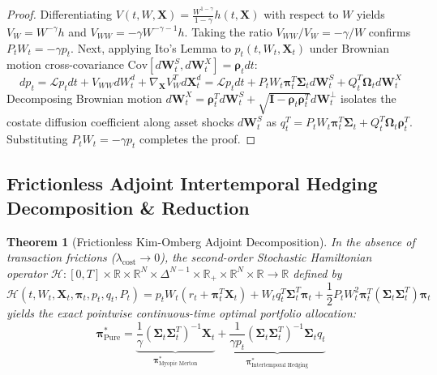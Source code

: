 \documentclass[11pt,a4paper]{article}
\theoremstyle{plain}
\newtheorem{theorem}{Theorem}[section]
\theoremstyle{definition}
\theoremstyle{remark}
\begin{document}
\begin{proof}
Differentiating $V(t, W, \mathbf{X}) = \frac{W^{1-\gamma}}{1-\gamma} h(t, \mathbf{X})$ with respect to $W$ yields $V_W = W^{-\gamma} h$ and $V_{WW} = -\gamma W^{-\gamma-1} h$. Taking the ratio $V_{WW} / V_W = -\gamma / W$ confirms $P_t W_t = -\gamma p_t$. Next, applying Ito's Lemma to $p_t(t, W_t, \mathbf{X}_t)$ under Brownian motion cross-covariance $\text{Cov}[d\mathbf{W}_t^S, d\mathbf{W}_t^X] = \mathbf{\rho}_t dt$:
\begin{equation}
    dp_t = \mathcal{L} p_t dt + V_{WW} dW_t^d + \nabla_{\mathbf{X}} V_W^T d\mathbf{X}_t^d = \mathcal{L} p_t dt + P_t W_t \mathbf{\pi}_t^T \mathbf{\Sigma}_t d\mathbf{W}_t^S + Q_t^T \mathbf{\Omega}_t d\mathbf{W}_t^X
\end{equation}
Decomposing Brownian motion $d\mathbf{W}_t^X = \mathbf{\rho}_t^T d\mathbf{W}_t^S + \sqrt{\mathbf{I} - \mathbf{\rho}_t \mathbf{\rho}_t^T} d\mathbf{W}_t^\perp$ isolates the costate diffusion coefficient along asset shocks $d\mathbf{W}_t^S$ as $q_t^T = P_t W_t \mathbf{\pi}_t^T \mathbf{\Sigma}_t + Q_t^T \mathbf{\Omega}_t \mathbf{\rho}_t^T$. Substituting $P_t W_t = -\gamma p_t$ completes the proof.
\end{proof}

\subsection{Frictionless Adjoint Intertemporal Hedging Decomposition \& Reduction}

\begin{theorem}[Frictionless Kim-Omberg Adjoint Decomposition]
\label{thm:smp_ko}
In the absence of transaction frictions ($\lambda_{\text{cost}} \to 0$), the second-order Stochastic Hamiltonian operator $\mathcal{H}: [0, T] \times \mathbb{R} \times \mathbb{R}^N \times \Delta^{N-1} \times \mathbb{R}_+ \times \mathbb{R}^N \times \mathbb{R} \to \mathbb{R}$ defined by
\begin{equation}
    \mathcal{H}(t, W_t, \mathbf{X}_t, \mathbf{\pi}_t, p_t, q_t, P_t) = p_t W_t \left( r_t + \mathbf{\pi}_t^T \mathbf{X}_t \right) + W_t q_t^T \mathbf{\Sigma}_t^T \mathbf{\pi}_t + \frac{1}{2} P_t W_t^2 \mathbf{\pi}_t^T (\mathbf{\Sigma}_t \mathbf{\Sigma}_t^T) \mathbf{\pi}_t
\end{equation}
yields the exact pointwise continuous-time optimal portfolio allocation:
\begin{equation}
    \mathbf{\pi}_{\text{Pure}}^* = \underbrace{\frac{1}{\gamma} (\mathbf{\Sigma}_t \mathbf{\Sigma}_t^T)^{-1} \mathbf{X}_t}_{\mathbf{\pi}_{\text{Myopic Merton}}^*} + \underbrace{\frac{1}{\gamma p_t} (\mathbf{\Sigma}_t \mathbf{\Sigma}_t^T)^{-1} \mathbf{\Sigma}_t q_t}_{\mathbf{\pi}_{\text{Intertemporal Hedging}}^*}
\end{equation}
\end{theorem}
\end{document}
